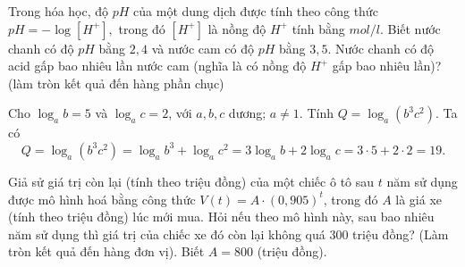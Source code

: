 \begin{ex}%
Trong hóa học, độ $ pH$ của một dung dịch được tính theo công thức $ pH=-\log\left[H^+\right],$ trong đó $\left[H^+\right]$ là nồng độ $H^+$ tính bằng $ mol/l$. Biết nước chanh có độ $ pH$ bằng $ 2{,}4$ và nước cam có độ $ pH$ bằng $ 3{,}5$. Nước chanh có độ acid gấp bao nhiêu lần nước cam (nghĩa là có nồng độ $H^+$ gấp bao nhiêu lần)? (làm tròn kết quả đến hàng phần chục)
\end{ex}

\begin{ex}%
Cho $\log_ab=5$ và $\log_ac=2$, với $ a,b,c$ dương; $ a\ne 1$. Tính $ Q=\log_a\left(b^3c^2\right)$.
\loigiai
{
	Ta có $$ Q=\log_a\left(b^3c^2\right)=\log_a{b^3}+\log_a{c^2}=3\log_ab+2\log_ac=3\cdot 5+2\cdot 2=19.$$}
\end{ex}

\begin{ex}%
Giả sử giá trị còn lại (tính theo triệu đồng) của một chiếc ô tô sau $t$ năm sử dụng được mô hình hoá bằng công thức $V(t)=A \cdot (0{,}905)^t$, trong đó $A$ là giá xe (tính theo triệu đồng) lúc mới mua. Hỏi nếu theo mô hình này, sau bao nhiêu năm sử dụng thì giá trị của chiếc xe đó còn lại không quá $300$ triệu đồng? (Làm tròn kết quả đến hàng đơn vị). Biết $A=800$ (triệu đồng).
\end{ex}

